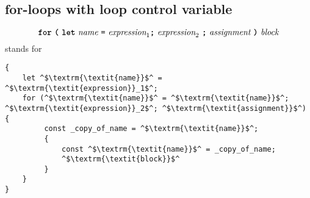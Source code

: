 \subsection*{\hypertarget{for2}{for-loops with loop control variable}}

\[\textbf{\texttt{for}}\ \textbf{\texttt{(}} \ 
\textbf{\texttt{let}}\ \textit{name}\ \texttt{=}\
\textit{expression}_1 \textbf{\texttt{;}} 
\ \textit{expression}_2 \ \textbf{\texttt{;}} \ \textit{assignment} \ \textbf{\texttt{)}} \ 
                                            \textit{block}
\]
stands for
\begin{center}
  \begin{minipage}{90mm}
  \begin{lstlisting}
{
    let ^$\textrm{\textit{name}}$^ = ^$\textrm{\textit{expression}}_1$^;
    for (^$\textrm{\textit{name}}$^ = ^$\textrm{\textit{name}}$^; ^$\textrm{\textit{expression}}_2$^; ^$\textrm{\textit{assignment}}$^) {
         const _copy_of_name = ^$\textrm{\textit{name}}$^;
         {
             const ^$\textrm{\textit{name}}$^ = _copy_of_name;
             ^$\textrm{\textit{block}}$^
         }
    }
}
  \end{lstlisting}
  \end{minipage}

\end{center}



